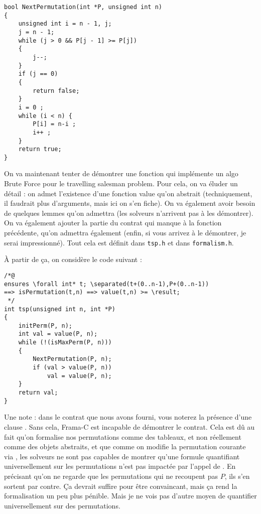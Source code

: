 \documentclass[11pt,answers]{exam}
\begin{document}
\begin{questions}
\begin{parts}
\begin{solutionorbox}
    \begin{lstlisting}
bool NextPermutation(int *P, unsigned int n)
{
    unsigned int i = n - 1, j;
    j = n - 1;
    while (j > 0 && P[j - 1] >= P[j])
    {
        j--;
    }
    if (j == 0)
    {
        return false;
    }
    i = 0 ;
    while (i < n) {
        P[i] = n-i ;
        i++ ;
    }
    return true;
}
    \end{lstlisting}
    \end{solutionorbox}

    \end{parts}


    On va maintenant tenter de démontrer une fonction qui implémente un algo Brute Force pour le travelling salesman problem.
    Pour cela, on va éluder un détail : on admet l’existence d’une fonction value qu’on abstrait (techniquement, il faudrait plus d’arguments, mais ici on s’en fiche). On va également avoir besoin de quelques lemmes qu’on admettra (les solveurs n’arrivent pas à les démontrer).
    On va également ajouter la partie du contrat qui manque à la fonction précédente, qu’on admettra également (enfin, si vous arrivez à le démontrer, je serai impressionné).
    Tout cela est définit dans \texttt{tsp.h} et dans \texttt{formalism.h}.

    À partir de ça, on considère le code suivant :

    \begin{lstlisting}
/*@
ensures \forall int* t; \separated(t+(0..n-1),P+(0..n-1))
==> isPermutation(t,n) ==> value(t,n) >= \result;
 */
int tsp(unsigned int n, int *P)
{
    initPerm(P, n);
    int val = value(P, n);
    while (!(isMaxPerm(P, n)))
    {
        NextPermutation(P, n);
        if (val > value(P, n))
            val = value(P, n);
    }
    return val;
}
    \end{lstlisting}

    Une note : dans le contrat que nous avons fourni, vous noterez la présence d’une clause \code{\\separated}. Sans cela, Frama-C est incapable de démontrer le contrat. Cela est dû au fait qu’on formalise nos permutations comme des tableaux, et non réellement comme des objets abstraits, et que comme on modifie la permutation courante via , les solveurs ne sont pas capables de montrer qu’une formule quantifiant universellement sur les permutations n’est pas impactée par l’appel de . En précisant qu’on ne regarde que les permutations qui ne recoupent pas $P$, ils s’en sortent par contre.
    Ça devrait suffire pour être convaincant, mais ça rend la formalisation un peu plus pénible. Mais je ne vois pas d’autre moyen de quantifier universellement sur des permutations.


\end{questions}
\end{document}
